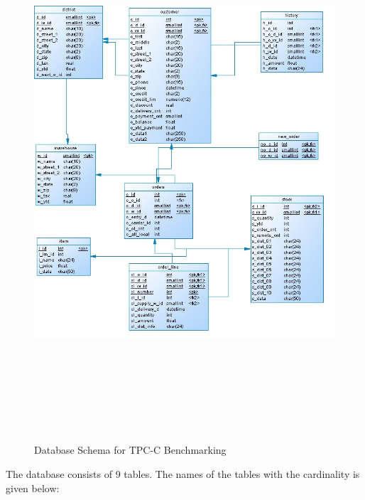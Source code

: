 \documentclass[12pt]{book}
\begin{document}
  \begin{figure}[H]
   \centering
   \includegraphics[width=17cm, height=20cm]{images/tpcc_intro2}
   \caption{Database Schema for TPC-C Benchmarking\label{fig:fig12_JMeter}}
  \end{figure}

The database consists of 9 tables. The names of the tables with the cardinality is given below\cite{Standard}:
 
\end{document}
